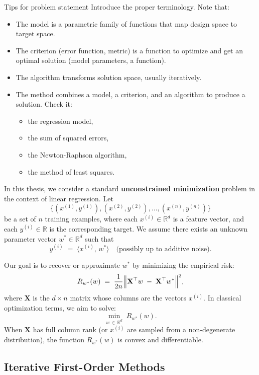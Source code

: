 Tips for problem statement
Introduce the proper terminology. Note that:
\begin{itemize}
    \item The model is a parametric family of functions that map design space to target space.
    \item The criterion (error function, metric) is a function to optimize and get an optimal solution (model parameters, a function).
    \item The algorithm transforms solution space, usually iteratively.
    \item The method combines a model, a criterion, and an algorithm to produce a solution. Check it:
    \begin{itemize}
        \item the regression model,
        \item the sum of squared errors,
        \item the Newton-Raphson algorithm,
        \item the method of least squares.
    \end{itemize}
\end{itemize}

\hrulefill

In this thesis, we consider a standard \textbf{unconstrained minimization} problem in the context of linear regression. Let
\[
  \{(x^{(1)}, y^{(1)}), (x^{(2)}, y^{(2)}), \dots, (x^{(n)}, y^{(n)})\}
\]
be a set of $n$ training examples, where each $x^{(i)} \in \mathbb{R}^d$ is a feature vector, and each $y^{(i)} \in \mathbb{R}$ is the corresponding target. We assume there exists an unknown parameter vector $w^* \in \mathbb{R}^d$ such that 
\[
  y^{(i)} \;=\; \langle x^{(i)}, \, w^* \rangle 
  \quad \text{(possibly up to additive noise).}
\]

Our goal is to recover or approximate $w^*$ by minimizing the empirical risk:
\begin{equation}
  \label{eq:empirical-risk}
  R_{w^*}(w) \;=\; \frac{1}{2n} \Bigl\|\mathbf{X}^{\top} w \;-\; \mathbf{X}^{\top} w^*\Bigr\|^2,
\end{equation}
where $\mathbf{X}$ is the $d \times n$ matrix whose columns are the vectors $x^{(i)}$. 
In classical optimization terms, we aim to solve:
\[
  \min_{w \,\in\, \mathbb{R}^d}\; R_{w^*}(w).
\]
When $\mathbf{X}$ has full column rank (or $x^{(i)}$ are sampled from a non-degenerate distribution), 
the function $R_{w^*}(w)$ is convex and differentiable.

\subsection{Iterative First-Order Methods}

